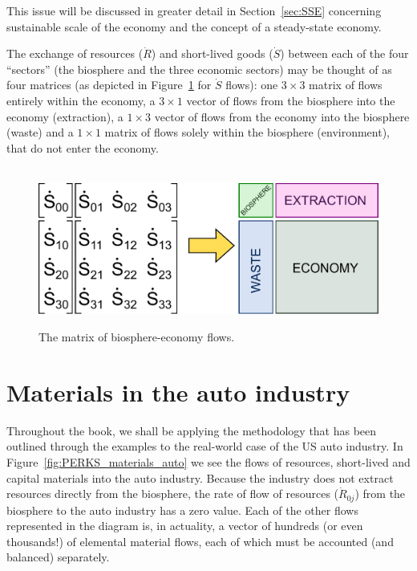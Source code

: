 \noindent{}This issue will be discussed in greater detail
in Section~\ref{sec:SSE} concerning 
sustainable scale of the economy and
the concept of a steady-state economy.

The exchange of resources ($\dot{R}$) and 
short-lived goods ($\dot{S}$) between 
each of the four ``sectors''
(the biosphere and 
the three economic sectors) 
may be thought of as four matrices 
(as depicted in Figure~\ref{fig:C_mat_matrix} 
for $\dot{S}$ flows): 
one $3\times3$ matrix of flows 
entirely within the economy, 
a $3\times1$ vector of flows from the 
biosphere into the economy (extraction), 
a $1\times3$ vector of flows from the economy 
into the biosphere (waste) 
and a $1\times1$ matrix of flows 
solely within the biosphere (environment), 
that do not enter the economy.

\begin{figure}[!ht]
\centering\
\includegraphics[width=0.8\linewidth]{Part_1/Chapter_Materials/images/Matrix.pdf}
\caption[The matrix of biosphere\index{biosphere}-economy flows.]{The matrix of biosphere-economy flows. 
}
\label{fig:C_mat_matrix}
\end{figure}

\section{Materials in the auto industry}
\label{sec:materials_auto}

Throughout the book, we shall be applying the methodology
that has been outlined through the examples to the
real-world case of the US auto industry.
In Figure~\ref{fig:PERKS_materials_auto}
we see the flows of resources,
short-lived and capital materials
into the auto industry.
Because the industry does not
extract resources directly from the biosphere,
the rate of flow of resources ($\dot{R}_{0j}$) 
from the biosphere to the auto industry 
has a zero value.
Each of the other flows represented in the diagram is,
in actuality,
a vector of hundreds (or even thousands!)
of elemental material flows,
each of which must be accounted 
(and balanced) separately.

